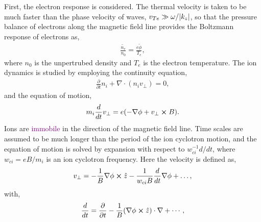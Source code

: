 First, the electron response is considered. The thermal velocity is taken to be much faster than the phase velocity of waves, $v_{Te} \gg \omega/\abs{k_z}$, so that the pressure balance of electrons along the magnetic field line provides the Boltzmann response of electrons as, 
\begin{align}
	\frac{\tilde{n_e}}{n_0} = \frac{e \tilde{\phi}}{T_e},
\end{align}
where $n_0$ is the unpertrubed density and $T_e$ is the electron temperature. The ion dynamics is studied by employing the continuity equation, 
\begin{align}
	\frac{\partial }{\partial t} n_i + \nabla \cdot (n_i v_{\perp}) = 0,
\end{align}
and the equation of motion, 
\begin{align}
	m_i \frac{d}{d t} v_{\perp} = e (- \nabla \phi + v_{\perp} \cross B).
\end{align}
Ions are \textcolor{purple}{immobile} in the direction of the magnetic field line. Time scales are assumed to be much longer than the period of the ion cyclotron motion, and the equation of motion is solved by expansion with respect to $w_{ci}^{-1} d/dt$, where $w_{ci} = eB/m_i$ is an ion cyclotron frequency. Here the velocity is defined as, 
\begin{align}
	v_{\perp} = -\frac{1}{B} \nabla \phi \cross \hat{z} - \frac{1}{w_{ci} B}\frac{d}{dt} \nabla \phi + \dots , 
\end{align} 
with, 
\begin{align}
	\frac{d}{dt} = \frac{\partial}{\partial t} - \frac{1}{B} (\nabla \phi \cross \hat{z}) \cdot \nabla + \cdots ,
\end{align}

